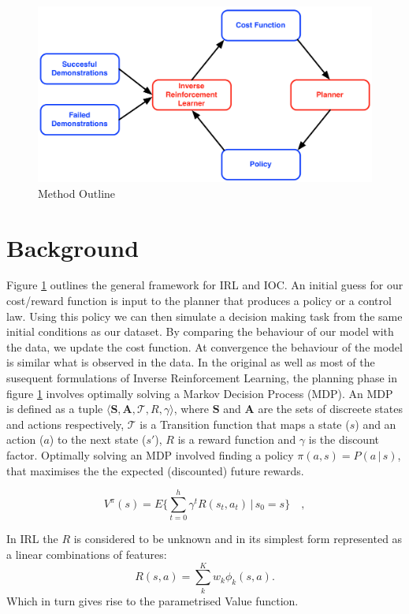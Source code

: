 \documentclass[letterpaper]{article}
\begin{document}
	
\begin{figure}[t]
  \centering
  \includegraphics[width=0.9\columnwidth]{images/irlf.png}
  \caption{Method Outline 	\label{fig:IRLoutline}}
\end{figure}

\section{Background}
Figure \ref{fig:IRLoutline} outlines the general framework for IRL and IOC. An initial guess for our cost/reward function is input to the planner that produces a policy or a control law. Using this policy we can then simulate a decision making task from the same initial conditions as our dataset. By comparing the behaviour of our model with the data, we update the cost function. At convergence the behaviour of the model is similar what is observed in the data.
In the original as well as most of the susequent formulations of Inverse Reinforcement Learning, the planning phase in figure \ref{fig:IRLoutline} involves optimally solving a Markov Decision Process (MDP). An MDP is defined as a tuple $\langle\mathbf{S},\mathbf{A},\mathcal{T},R,\gamma\rangle$, where $\mathbf{S}$ and $\mathbf{A}$ are the sets of discreete states and actions respectively, $\mathcal{T}$ is a Transition function that maps a state ($s$) and an action ($a$) to the next state ($s'$), $R$ is a reward function and $\gamma$ is the discount factor. 
Optimally solving an MDP involved finding a policy $\pi(a,s) = P(a\,|\,s)$, that maximises the the expected (discounted) future rewards.

\begin{equation}
 V^\pi(s) = E\{\sum_{t = 0}^h \gamma^tR(s_t,a_t)\,\vert\, s_0 = s\}\quad,
\end{equation}

In IRL the $R$ is considered to be unknown and in its simplest form represented as a linear combinations of features:
\begin{equation}
R(s,a) = \sum_k^Kw_k\phi_k(s,a). \label{eq:rew}
\end{equation}
Which in turn gives rise to the parametrised Value function.
\end{document}
